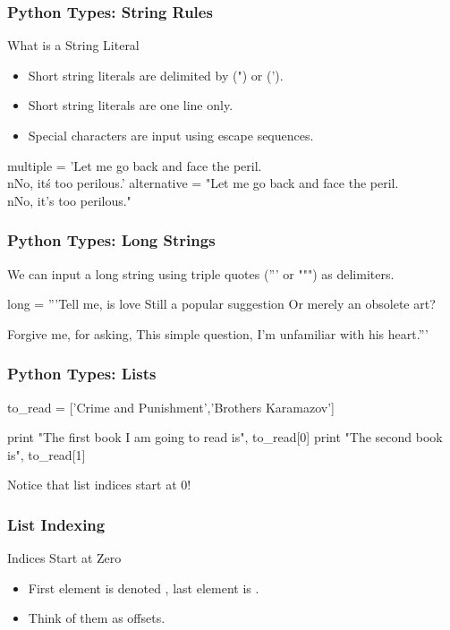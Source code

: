\begin{frame}[fragile]
\frametitle{Python Types: String Rules}

\begin{block}{What is a String Literal}
\begin{itemize}
\item Short string literals are delimited by (") or (').
\item Short string literals are one line only.
\item Special characters are input using escape sequences.
\end{itemize}
\end{block}

\begin{python}
multiple = 'Let  me go back and face the peril.\\nNo, it\'s too perilous.'
alternative = "Let  me go back and face the peril.\\nNo, it's too perilous."
\end{python}
\end{frame}

\begin{frame}[fragile]
\frametitle{Python Types: Long Strings}

We can input a long string using triple quotes (''' or """) as delimiters.

\begin{python}
long = '''Tell me, is love
Still a popular suggestion
Or merely an obsolete art?

Forgive me, for asking,
This simple question,
I'm unfamiliar with his heart.'''
\end{python}
\end{frame}

\begin{frame}[fragile]
\frametitle{Python Types: Lists}
\begin{python}
to_read = ['Crime and Punishment','Brothers Karamazov']

print "The first book I am going to read is", to_read[0]
print "The second book is", to_read[1]

\end{python}

Notice that list indices start at \alert{0}!

\end{frame}

\begin{frame}[fragile]
\frametitle{List Indexing}
\begin{block}{Indices Start at Zero}
\begin{itemize}
\item First element is denoted , last element is .
\item Think of them as \alert{offsets}.
\end{itemize}
\end{block}
\end{frame}


